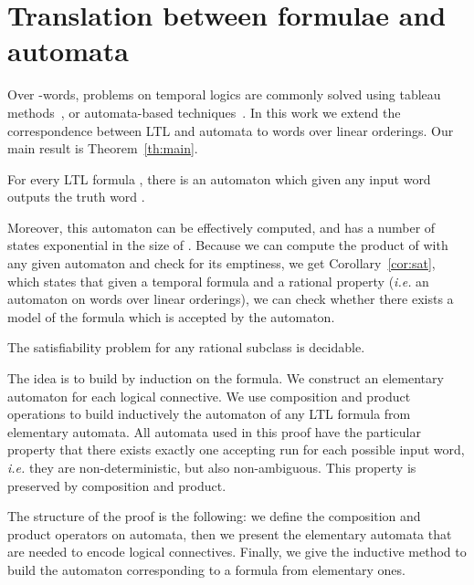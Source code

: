 \documentclass[envcountsame]{fsttcs-ps}
\newcommand{\ie}{\textit{i.e.}\xspace}
\begin{document}
\section{Translation between formulae and automata}
\label{s:trans}

Over -words, problems on temporal logics are commonly solved
using tableau methods~\cite{Wolper85thetableau}, or automata-based
techniques~\cite{DBLP:conf/lics/VardiW86}.  In this work we extend the
correspondence between LTL and automata to words over linear orderings.  Our
main result is Theorem~\ref{th:main}.

\begin{theorem}
\label{th:main}
For every LTL formula , there is an automaton  which
given any input word  outputs the truth word .
\end{theorem}

Moreover, this automaton  can be effectively computed, and has a
number of states exponential in the size of .  Because we can compute
the product of  with any given automaton and check for its
emptiness, we get Corollary~\ref{cor:sat}, which states that given a temporal
formula and a rational property (\ie an automaton on words over linear
orderings), we can check whether there exists a model of the formula which is
accepted by the automaton.

\begin{corollary}
\label{cor:sat}
The satisfiability problem for any rational subclass is decidable.
\end{corollary}



The idea is to build  by induction on the formula.  We construct
an elementary automaton for each logical connective. We use composition and
product operations to build inductively the automaton of any LTL formula from
elementary automata.  All automata used in this proof have the particular
property that there exists exactly one accepting run for each possible input
word, \ie they are non-deterministic, but also non-ambiguous.  This property
is preserved by composition and product.

The structure of the proof is the following: we define the composition and
product operators on automata, then we present the elementary automata that are
needed to encode logical connectives. Finally, we give the inductive method to
build the automaton corresponding to a formula from elementary ones.
\end{document}
